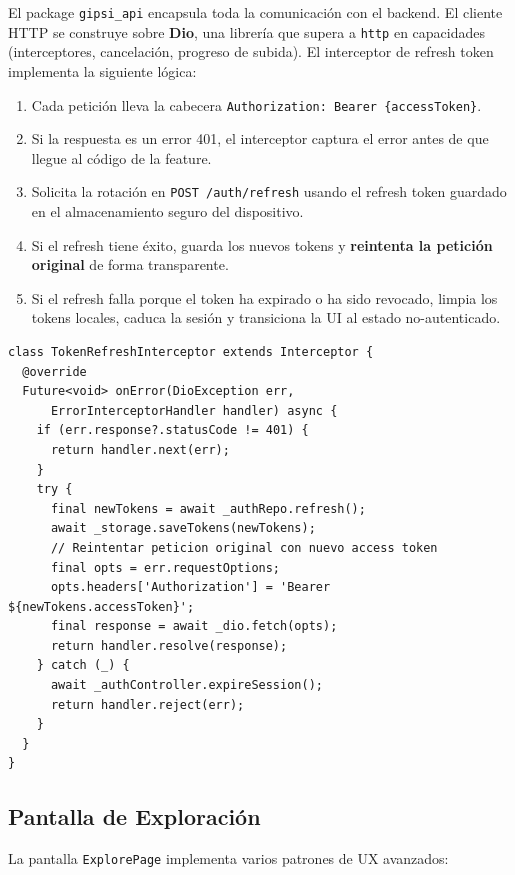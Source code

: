 \documentclass[12pt,a4paper,twoside]{report}
\begin{document}
El package \texttt{gipsi\_api} encapsula toda la comunicación con el backend. El cliente HTTP se construye sobre \textbf{Dio}, una librería que supera a \texttt{http} en capacidades (interceptores, cancelación, progreso de subida). El interceptor de refresh token implementa la siguiente lógica:

\begin{enumerate}
  \item Cada petición lleva la cabecera \texttt{Authorization: Bearer \{accessToken\}}.
  \item Si la respuesta es un error 401, el interceptor captura el error antes de que llegue al código de la feature.
  \item Solicita la rotación en \texttt{POST /auth/refresh} usando el refresh token guardado en el almacenamiento seguro del dispositivo.
  \item Si el refresh tiene éxito, guarda los nuevos tokens y \textbf{reintenta la petición original} de forma transparente.
  \item Si el refresh falla porque el token ha expirado o ha sido revocado, limpia los tokens locales, caduca la sesión y transiciona la UI al estado no-autenticado.
\end{enumerate}

\begin{lstlisting}[style=dartStyle, caption={Interceptor de refresh token en Dio}, label={lst:interceptor}]
class TokenRefreshInterceptor extends Interceptor {
  @override
  Future<void> onError(DioException err,
      ErrorInterceptorHandler handler) async {
    if (err.response?.statusCode != 401) {
      return handler.next(err);
    }
    try {
      final newTokens = await _authRepo.refresh();
      await _storage.saveTokens(newTokens);
      // Reintentar peticion original con nuevo access token
      final opts = err.requestOptions;
      opts.headers['Authorization'] = 'Bearer ${newTokens.accessToken}';
      final response = await _dio.fetch(opts);
      return handler.resolve(response);
    } catch (_) {
      await _authController.expireSession();
      return handler.reject(err);
    }
  }
}
\end{lstlisting}

\subsection{Pantalla de Exploración}

La pantalla \texttt{ExplorePage} implementa varios patrones de UX avanzados:
\end{document}
